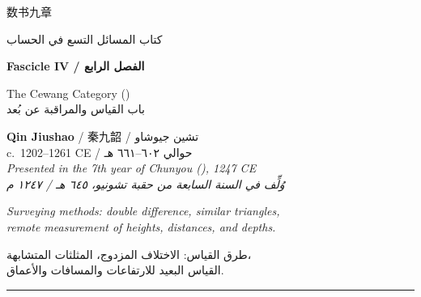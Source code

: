 \documentclass[11pt,a4paper]{article}
\begin{document}
\begin{titlepage}
\thispagestyle{empty}
\centering
\vspace*{1.5cm}

{\fontsize{24}{30}\selectfont\chineselg
\textcolor{titlecolor}{数书九章}}

\vspace{0.4cm}

{\fontsize{18}{24}\selectfont\arabicfont
\textcolor{titlecolor}{\beginR كتاب المسائل التسع في الحساب\endR}}

\vspace{0.8cm}

{\Large\textbf{Fascicle IV / الفصل الرابع}}

\vspace{0.3cm}

{\large
\textcolor{sectioncolor}{The Cewang Category ()}\\[0.3em]
\textcolor{sectioncolor}{\arabicfont\beginR باب القياس والمراقبة عن بُعد\endR}
}

\vspace{1.2cm}

{\large
\textbf{Qin Jiushao} / \chfont 秦九韶 / \arabicfont\beginR تشين جيوشاو\endR\\[0.3em]
c.\ 1202--1261 CE / \arabicfont\beginR حوالي ٦٠٢--٦٦١ هـ\endR\\[0.5em]
\textit{Presented in the 7th year of Chunyou (), 1247 CE}\\[0.2em]
\textit{\arabicfont\beginR وُلِّف في السنة السابعة من حقبة تشونيو، ٦٤٥ هـ / ١٢٤٧ م\endR}
}

\vspace{1cm}

{\normalsize\textit{
Surveying methods: double difference, similar triangles,\\
remote measurement of heights, distances, and depths.}}

\vspace{0.3cm}

{\arabicfont\beginR 
طرق القياس: الاختلاف المزدوج، المثلثات المتشابهة،\\
القياس البعيد للارتفاعات والمسافات والأعماق.
\endR}

\vspace{1cm}

\textcolor{colrule}{\rule{0.6\textwidth}{0.8pt}}


\end{titlepage}
\end{document}
